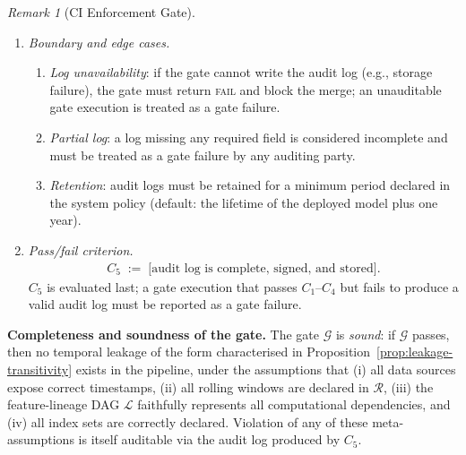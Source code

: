 \documentclass[12pt,openany]{book}
\numberwithin{equation}{chapter}
\theoremstyle{plain}
\theoremstyle{definition}
\theoremstyle{remark}
\newtheorem{remark}[theorem]{Remark}
\numberwithin{equation}{chapter}
\theoremstyle{plain}
\begin{document}
\begin{remark}[CI Enforcement Gate]
\begin{enumerate}
\begin{enumerate}
    \item \emph{Boundary and edge cases.}
    \begin{enumerate}
      \item \emph{Log unavailability}: if the gate
            cannot write the audit log (e.g., storage
            failure), the gate must return
            \textsc{fail} and block the merge; an
            unauditable gate execution is treated as a
            gate failure.
      \item \emph{Partial log}: a log missing any
            required field is considered incomplete
            and must be treated as a gate failure by
            any auditing party.
      \item \emph{Retention}: audit logs must be
            retained for a minimum period declared in
            the system policy (default: the lifetime
            of the deployed model plus one year).
    \end{enumerate}

    \item \emph{Pass/fail criterion.}
          \begin{align}
            C_{5} \;:=\;
            \bigl[\text{audit log is complete,}
            \text{ signed, and stored}\bigr].
            \label{eq:c5-def}
          \end{align}
          $C_{5}$ is evaluated last; a gate execution
          that passes $C_{1}$--$C_{4}$ but fails to
          produce a valid audit log must be reported as
          a gate failure.

  \end{enumerate}

\end{enumerate}

\medskip
\noindent\textbf{Completeness and soundness of the gate.}
The gate $\mathcal{G}$ is \emph{sound}: if
$\mathcal{G}$ passes, then no temporal leakage of the
form characterised in Proposition~\ref{prop:leakage-transitivity}
exists in the pipeline, under the assumptions that
(i) all data sources expose correct timestamps,
(ii) all rolling windows are declared in $\mathcal{R}$,
(iii) the feature-lineage DAG $\mathcal{L}$ faithfully
represents all computational dependencies, and
(iv) all index sets are correctly declared.
Violation of any of these meta-assumptions is itself
auditable via the audit log produced by $C_{5}$.

\end{remark}

\end{document}

